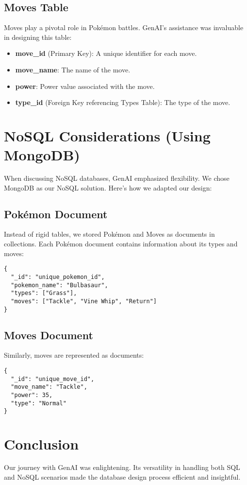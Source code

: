 \documentclass{article}
\begin{document}
\subsection{Moves Table}
Moves play a pivotal role in Pokémon battles. GenAI's assistance was invaluable in designing this table:

\begin{itemize}
    \item \textbf{move\_id} (Primary Key): A unique identifier for each move.
    \item \textbf{move\_name}: The name of the move.
    \item \textbf{power}: Power value associated with the move.
    \item \textbf{type\_id} (Foreign Key referencing Types Table): The type of the move.
\end{itemize}

\section{NoSQL Considerations (Using MongoDB)}
When discussing NoSQL databases, GenAI emphasized flexibility. We chose MongoDB as our NoSQL solution. Here's how we adapted our design:

\subsection{Pokémon Document}
Instead of rigid tables, we stored Pokémon and Moves as documents in collections. Each Pokémon document contains information about its types and moves:

\begin{verbatim}
{
  "_id": "unique_pokemon_id",
  "pokemon_name": "Bulbasaur",
  "types": ["Grass"],
  "moves": ["Tackle", "Vine Whip", "Return"]
}
\end{verbatim}

\subsection{Moves Document}
Similarly, moves are represented as documents:

\begin{verbatim}
{
  "_id": "unique_move_id",
  "move_name": "Tackle",
  "power": 35,
  "type": "Normal"
}
\end{verbatim}

\section{Conclusion}
Our journey with GenAI was enlightening. Its versatility in handling both SQL and NoSQL scenarios made the database design process efficient and insightful.
\end{document}
